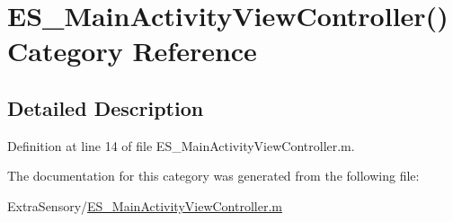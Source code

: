 \hypertarget{category_e_s___main_activity_view_controller_07_08}{\section{E\+S\+\_\+\+Main\+Activity\+View\+Controller() Category Reference}
\label{category_e_s___main_activity_view_controller_07_08}
}


\subsection{Detailed Description}


Definition at line 14 of file E\+S\+\_\+\+Main\+Activity\+View\+Controller.\+m.



The documentation for this category was generated from the following file\+:\begin{DoxyCompactItemize}
\item 
Extra\+Sensory/\hyperlink{_e_s___main_activity_view_controller_8m}{E\+S\+\_\+\+Main\+Activity\+View\+Controller.\+m}\end{DoxyCompactItemize}
